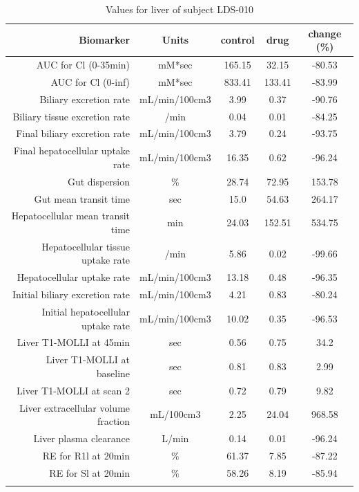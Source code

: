 \documentclass{epflreport}%
\begin{document}
%
\clearpage%
\begin{longtable}{rcccc}%
\hline%
Biomarker&Units&control&drug&change (\%)\\%
\hline%
AUC for Cl (0{-}35min)&mM*sec&165.15&32.15&{-}80.53\\%
AUC for Cl (0{-}inf)&mM*sec&833.41&133.41&{-}83.99\\%
Biliary excretion rate&mL/min/100cm3&3.99&0.37&{-}90.76\\%
Biliary tissue excretion rate&/min&0.04&0.01&{-}84.25\\%
Final biliary excretion rate&mL/min/100cm3&3.79&0.24&{-}93.75\\%
Final hepatocellular uptake rate&mL/min/100cm3&16.35&0.62&{-}96.24\\%
Gut dispersion&\%&28.74&72.95&153.78\\%
Gut mean transit time&sec&15.0&54.63&264.17\\%
Hepatocellular mean transit time&min&24.03&152.51&534.75\\%
Hepatocellular tissue uptake rate&/min&5.86&0.02&{-}99.66\\%
Hepatocellular uptake rate&mL/min/100cm3&13.18&0.48&{-}96.35\\%
Initial biliary excretion rate&mL/min/100cm3&4.21&0.83&{-}80.24\\%
Initial hepatocellular uptake rate&mL/min/100cm3&10.02&0.35&{-}96.53\\%
Liver T1{-}MOLLI at 45min&sec&0.56&0.75&34.2\\%
Liver T1{-}MOLLI at baseline&sec&0.81&0.83&2.99\\%
Liver T1{-}MOLLI at scan 2&sec&0.72&0.79&9.82\\%
Liver extracellular volume fraction&mL/100cm3&2.25&24.04&968.58\\%
Liver plasma clearance&L/min&0.14&0.01&{-}96.24\\%
RE for R1l at 20min&\%&61.37&7.85&{-}87.22\\%
RE for Sl at 20min&\%&58.26&8.19&{-}85.94\\%
\hline%
\caption{Values for liver of subject LDS-010} \\%
\end{longtable}%
\end{document}
